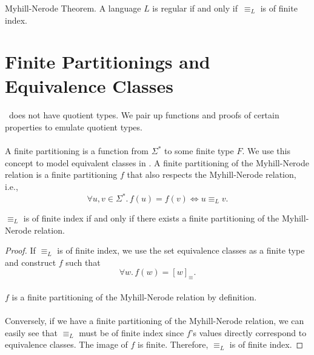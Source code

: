 
\begin{theorem}{Myhill-Nerode Theorem.}
    \label{MN}
    A language $L$ is regular if and only if $\,\equiv_L$ is of finite index.
\end{theorem}

\section{Finite Partitionings and Equivalence Classes}

\paragraph{}
\coq\ does not have quotient types. 
We pair up functions and proofs of certain properties to emulate quotient types.

\paragraph{} 
A finite partitioning is a function from $\Sigma^*$ to some finite type $F$. 
We use this concept to model equivalent classes in \coq. 
A finite partitioning of the Myhill-Nerode relation is a finite partitioning $f$ that also respects the Myhill-Nerode relation, i.e.,
\begin{equation*}
    \forall u, v \in \Sigma^*. \,
    f(u) = f(v) \Leftrightarrow u \equiv_L v.
\end{equation*}



\begin{theorem}
    $\equiv_L$ is of finite index if and only if there exists a finite partitioning of the Myhill-Nerode relation.
\end{theorem}

\begin{proof}
    If $\equiv_L$ is of finite index, we use the set equivalence classes as a finite type and construct $f$ such that
    \begin{equation*}
        \forall w.\, f(w) = [w]_\equiv.
    \end{equation*}
    \paragraph{}
    $f$ is a finite partitioning of the Myhill-Nerode relation by definition.

    \paragraph{}
    Conversely, if we have a finite partitioning of the Myhill-Nerode relation, we can easily see that $\equiv_L$ must be of finite index since $f$'s values directly correspond to equivalence classes. The image of $f$ is finite. Therefore, $\equiv_L$ is of finite index.
\end{proof}

